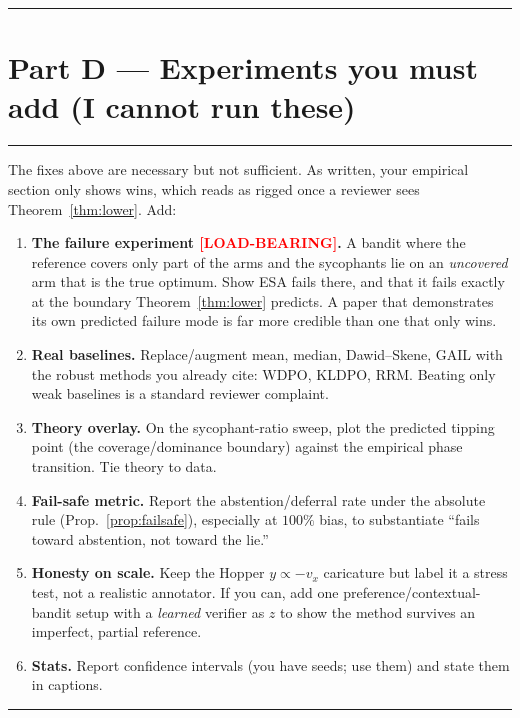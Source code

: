 \documentclass[11pt]{article}
\theoremstyle{definition}
\theoremstyle{remark}
\begin{document}
\bigskip
\hrule
\section*{Part D --- Experiments you must add (I cannot run these)}
\hrule

\noindent The fixes above are necessary but not sufficient. As written, your empirical section only
shows wins, which reads as rigged once a reviewer sees Theorem~\ref{thm:lower}. Add:

\begin{enumerate}[nosep]
\item \textbf{The failure experiment \textcolor{red}{[LOAD-BEARING]}.} A bandit where the reference
covers only part of the arms and the sycophants lie on an \emph{uncovered} arm that is the true
optimum. Show ESA fails there, and that it fails exactly at the boundary
Theorem~\ref{thm:lower} predicts. A paper that demonstrates its own predicted failure mode is far
more credible than one that only wins.
\item \textbf{Real baselines.} Replace/augment mean, median, Dawid--Skene, GAIL with the robust
methods you already cite: WDPO, KLDPO, RRM. Beating only weak baselines is a standard reviewer
complaint.
\item \textbf{Theory overlay.} On the sycophant-ratio sweep, plot the predicted tipping point (the
coverage/dominance boundary) against the empirical phase transition. Tie theory to data.
\item \textbf{Fail-safe metric.} Report the abstention/deferral rate under the absolute rule
(Prop.~\ref{prop:failsafe}), especially at $100\%$ bias, to substantiate ``fails toward abstention,
not toward the lie.''
\item \textbf{Honesty on scale.} Keep the Hopper $y\propto -v_x$ caricature but label it a stress
test, not a realistic annotator. If you can, add one preference/contextual-bandit setup with a
\emph{learned} verifier as $z$ to show the method survives an imperfect, partial reference.
\item \textbf{Stats.} Report confidence intervals (you have seeds; use them) and state them in
captions.
\end{enumerate}

\bigskip
\hrule
\end{document}
